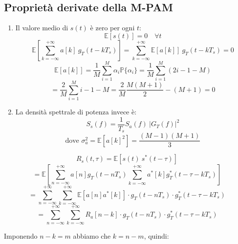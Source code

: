 \subsection*{Proprietà derivate della M-PAM}
\begin{enumerate}
    \item Il valore medio di \( s(t) \) è zero per ogni \( t \):
          \begin{equation*}
              \mathbb{E}\left[ s(t) \right] = 0 \quad \forall t
          \end{equation*}
          \begin{equation*}
              \mathbb{E} \left[ \sum_{k=-\infty}^{+\infty} a[k] \ g_T(t-kT_s) \right] = \sum_{k=-\infty}^{+\infty} \mathbb{E}\left[a[k]\right]\ g_T(t-kT_s) = 0
          \end{equation*}
          \begin{equation*}
              \mathbb{E}\left[a[k]\right] = \frac{1}{M} \sum_{i=1}^{M} \alpha_i \mathbb{P}\{\alpha_i\} = \frac{1}{M} \sum_{i=1}^{M} (2i - 1 - M)
          \end{equation*}
          \begin{equation*}
              = \frac{2}{M} \sum_{i=1}^{M} i - 1 - M = \frac{2}{M} \frac{M(M+1)}{2} - (M+1) = 0
          \end{equation*}

    \item La densità spettrale di potenza invece è:
          \begin{equation*}
              S_s(f) = \frac{1}{T_s} S_a(f) \ |G_T(f)|^2
          \end{equation*}
          \begin{equation*}
              \text{dove } \sigma_a^2 = \mathbb{E}\left[ a\left[k\right]^2 \right] = \frac{(M-1)(M+1)}{3}
          \end{equation*}
\end{enumerate}

\[
    R_s(t,\tau) = \mathbb{E}[s(t) \ s^*(t-\tau)]
\]
\[
    = \mathbb{E} \left[ \sum_{n=-\infty}^{+\infty} a\left[n\right] g_T(t - nT_s) \sum_{k=-\infty}^{+\infty} a^*\left[k\right] g_T^*(t - \tau - kT_s) \right]
\]
\[
    = \sum_{n=-\infty}^{+\infty} \sum_{k=-\infty}^{+\infty} \mathbb{E}[a\left[n\right] a^*\left[k\right]] \cdot g_T(t - nT_s) \cdot g_T^*(t - \tau - kT_s)
\]
\[
    = \sum_{n=-\infty}^{+\infty} \sum_{k=-\infty}^{+\infty} R_a\left[n-k\right] \cdot g_T(t - nT_s) \cdot g_T^*(t - \tau - kT_s)
\]

Imponendo \( n-k = m \) abbiamo che \( k = n-m \), quindi:

